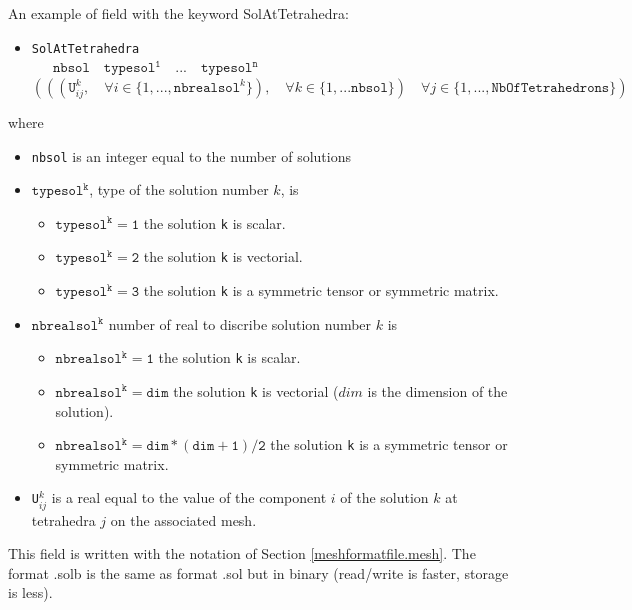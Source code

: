 \documentclass[a4paper,twoside,12pt]{book}
\begin{document}
An example of field with the keyword SolAtTetrahedra:
\small
\begin{itemize}
\item {\tt{SolAtTetrahedra}}\\
  {\tt \obeylines
  $ \mathtt{ \quad nbsol \quad typesol^1 \quad ... \quad typesol^n }  $
  $\left(\left(\left( \mathtt{U}_{ij}^k, \quad \forall i \in \{1,...,\mathtt{nbrealsol}^k\}\right), %
\quad \forall k \in \{1,...\mathtt{nbsol}\}\right) %
 \quad \forall j \in \{1,...,\mathtt{NbOfTetrahedrons}\}\right)$
 }
\end{itemize}
where
\begin{itemize}
\item {\tt  nbsol} is an integer equal to the number of solutions
\item $\mathtt{  typesol^k}$, type of the solution  number $ k$, is
  \begin{itemize}
   \item $\mathtt{typesol^k = 1}$ the solution {\tt k} is scalar.
   \item $\mathtt{typesol^k = 2}$ the solution {\tt k} is vectorial.
   \item $\mathtt{typesol^k = 3}$ the solution {\tt k} is a symmetric tensor or symmetric matrix.
   \end{itemize}
\item  $\mathtt{  nbrealsol^k}$ number of real to discribe solution number $k$ is
  \begin{itemize}
   \item $\mathtt{nbrealsol^k = 1}$ the solution {\tt k} is scalar.
   \item $\mathtt{nbrealsol^k = dim}$ the solution {\tt k} is vectorial ($dim$ is the dimension of the solution).
   \item $\mathtt{nbrealsol^k = dim*(dim+1)/2}$ the solution {\tt k} is a symmetric tensor or symmetric matrix.
   \end{itemize}
\item  {\tt U$_{ij}^k$} is a real equal to the value of the component  $i$ of the solution  $k$ at tetrahedra $j$
on the associated mesh.
\end{itemize}

This field is written with the notation of Section \ref{meshformatfile.mesh}.
The format .solb is the same as format .sol but in binary (read/write is faster, storage is less).
\end{document}
